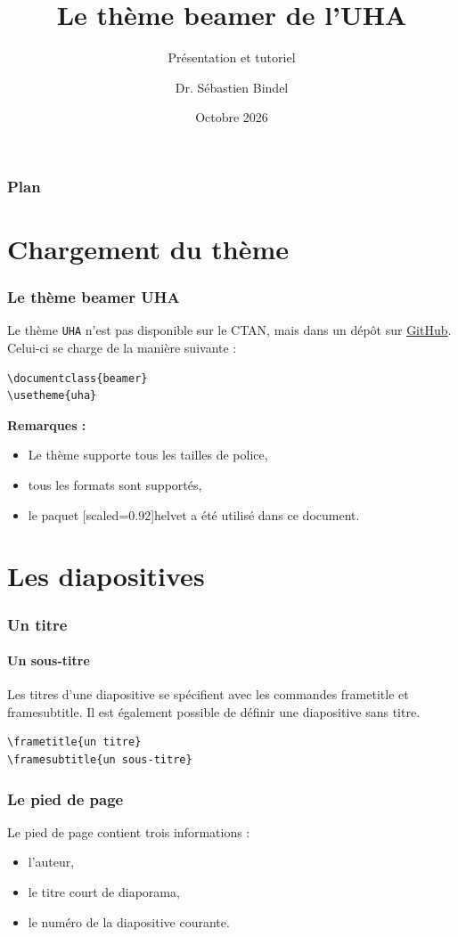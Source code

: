 \documentclass[9pt]{beamer}
\title{Le thème beamer de l'UHA}
\subtitle{Présentation et tutoriel}
\date{Octobre 2026}
\author{Dr. Sébastien Bindel}
\institute{Equipe RT, labortatoire IRIMAS}
\begin{document}
\begin{frame}
	\titlepage
\end{frame}

\begin{frame}
	\titlepage
\end{frame}

\begin{frame}
	\frametitle{Plan}
	\tableofcontents
\end{frame}

\section{Chargement du thème}
%
\begin{frame}[fragile]
	\frametitle{Le thème beamer UHA}
	Le thème \alert{\texttt{UHA}} n'est pas disponible sur le CTAN, mais dans un dépôt sur \href{https://github.com/sbindel/beamer-theme-uha}{GitHub}. Celui-ci se charge de la manière suivante :
	\begin{lstlisting}[frame=single]
\documentclass{beamer}
\usetheme{uha}
	\end{lstlisting}

	\textbf{Remarques :}
	\begin{itemize}
		\item Le thème supporte tous les tailles de police,
		\item tous les formats sont supportés,
		\item le paquet [scaled=0.92]{helvet} a été utilisé dans ce document.
	\end{itemize}
\end{frame}
%
\section{Les diapositives}

\begin{frame}[fragile]
	\frametitle{Un titre}
	\framesubtitle{Un sous-titre}
	Les titres d'une diapositive se spécifient avec les commandes \alert{frametitle} et \alert{framesubtitle}. Il est également possible de définir une diapositive sans titre.
		\begin{lstlisting}[frame=single]
\frametitle{un titre}
\framesubtitle{un sous-titre}
	\end{lstlisting}
\end{frame}

\begin{frame}
	\frametitle{Le pied de page}
	Le pied de page contient trois informations :
	\begin{itemize}
		\item l'auteur,
		\item le titre court de diaporama,
		\item le numéro de la diapositive courante.
	\end{itemize}
\end{frame}
\end{document}
